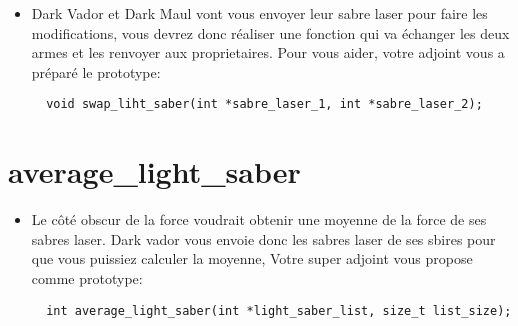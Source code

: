 \documentclass{koala-en}
\begin{document}

\begin{itemize}
  \item
Dark Vador et Dark Maul vont vous envoyer leur sabre laser pour faire les modifications, vous devrez donc réaliser une fonction qui va échanger les deux armes et les renvoyer aux proprietaires. Pour vous aider, votre adjoint vous a préparé le prototype:
\begin{lstlisting}
  void swap_liht_saber(int *sabre_laser_1, int *sabre_laser_2);
\end{lstlisting}
\end{itemize}
\newpage

\chapter{average\_light\_saber}


\begin{itemize}
  \item
Le côté obscur de la force voudrait obtenir une moyenne de la force de ses sabres laser. Dark vador vous envoie donc les sabres laser de ses sbires pour que vous puissiez calculer la
moyenne, Votre super adjoint vous propose comme prototype:
\begin{lstlisting}
  int average_light_saber(int *light_saber_list, size_t list_size);
\end{lstlisting}
\end{itemize}
\end{document}
